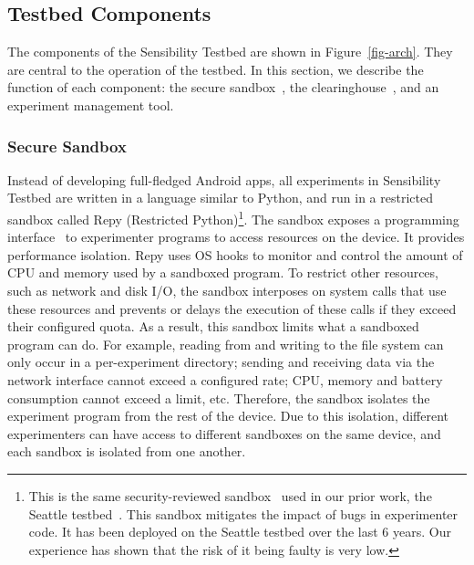 

\subsection{Testbed Components}\label{sec-component}

The components of the Sensibility Testbed are shown in Figure~\ref{fig-arch}.
They are central to the operation of the testbed. 
In this section, we describe the function of each component: the
secure sandbox~\cite{cappos2010retaining}, the clearinghouse~\cite{ch}, 
and an experiment management tool.

\subsubsection{Secure Sandbox}\label{sec-repy}

Instead of developing full-fledged Android apps, all 
experiments in Sensibility Testbed are written in a language
similar to Python, and run in a restricted %
sandbox called Repy (Restricted Python)\footnote{\scriptsize This is the 
same security-reviewed sandbox~\cite{cappos2010retaining} used in
our prior work, the Seattle testbed~\cite{seattle}. This sandbox
mitigates the impact of bugs in experimenter code. It
has been deployed on the Seattle testbed over the last 6 years.
Our experience has shown that the risk of it being faulty is
very low.}. The sandbox exposes a programming 
interface~\cite{repyv2} to experimenter programs to access 
resources on the device. It provides performance isolation.
Repy uses OS hooks to monitor and control the amount of 
CPU and memory used by a sandboxed program. To restrict 
other resources, such as network and disk I/O, the sandbox 
interposes on system calls that use these resources and 
prevents or delays the execution of these calls if they exceed 
their configured quota. As a result, this sandbox limits 
what a sandboxed program can do. For example, reading from and writing to the file system can
only occur in a per-experiment directory; sending and receiving
data via the network interface cannot exceed a configured rate;
CPU, memory and battery consumption cannot exceed a limit, etc.
Therefore, the sandbox isolates the experiment program from 
the rest of the device. Due to this isolation, different experimenters
can have access to different sandboxes on the same device,
and each sandbox is isolated from one another.

